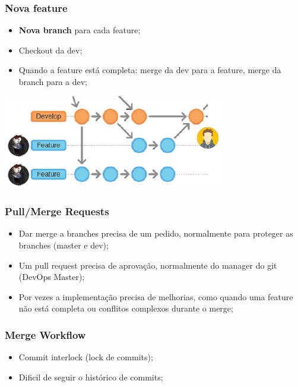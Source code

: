 \documentclass{article}
\begin{document}
\subsubsection*{Nova feature}

\begin{itemize}
  \item \textbf{Nova branch} para cada feature;
  \item Checkout da dev;
  \item Quando a feature está completa: merge da dev para a feature,
  merge da branch para a dev;
\end{itemize}

\begin{center}
  \includegraphics[scale=0.6]{52}
\end{center}

\subsubsection*{Pull/Merge Requests}

\begin{itemize}
  \item Dar merge a branches precisa de um pedido, normalmente para
  proteger as branches (master e dev);
  \item Um pull request precisa de aprovação, normalmente do manager
  do git (DevOps Master);
  \item Por vezes a implementação precisa de melhorias, como quando uma
  feature não está completa ou conflitos complexos durante o merge;
\end{itemize}

\pagebreak

\subsubsection{Merge Workflow}

\begin{itemize}
  \item Commit interlock (lock de commits);
  \item Dificil de seguir o histórico de commits;
\end{itemize}
\end{document}
